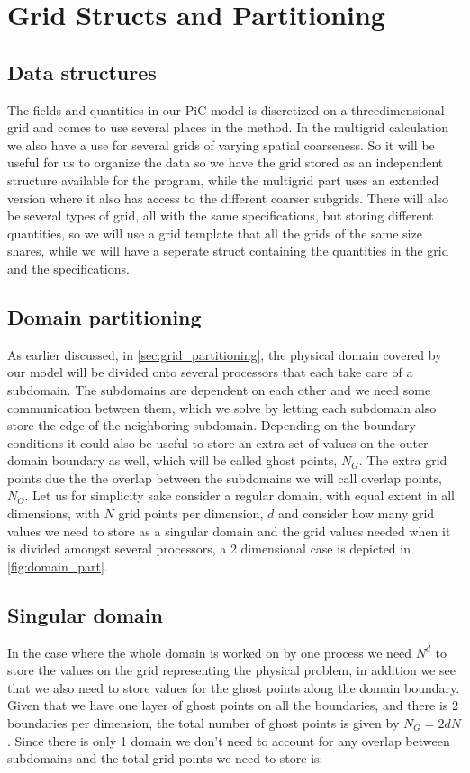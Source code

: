 	\section{Grid Structs and Partitioning}

	\subsection{Data structures}
	The fields and quantities in our PiC model is discretized on a threedimensional
	grid and comes to use several places in the method. In the multigrid calculation
	we also have a use for several grids of varying spatial coarseness. So it will
	be useful for us to organize the data so we have the grid stored as an
	independent structure available for the program, while the multigrid part uses
	an extended version where it also has access to the different coarser subgrids.
	There will also be several types of grid, all with the same specifications,
	but storing different quantities, so we will use a grid template that all the
	grids of the same size shares, while we will have a seperate struct containing
	the quantities in the grid and the specifications.



	\subsection{Domain partitioning}
		As earlier discussed, in \ref{sec:grid_partitioning}, the physical domain
		covered by our model will be divided onto several processors that each take
		care of a subdomain. The subdomains are dependent on each other and we need
		some communication between them, which we solve by letting each subdomain
		also store the edge of the neighboring subdomain. Depending on the boundary
		conditions it could also be useful to store an extra set of values on the
		outer domain boundary as well, which will be called ghost points, \(N_G\).
		The extra grid points due the the overlap between the subdomains we will call
		overlap points, \(N_O\). Let us for simplicity sake consider a regular domain,
		with equal extent in all dimensions, with \(N\) grid points per dimension,
		\(d\) and consider how many grid values we need to store as a singular domain
		and the grid values needed when it is divided amongst several processors, a
		2 dimensional case is depicted in \cref{fig:domain_part}.

		\subsection{Singular domain}
		In the case where the whole domain is worked on by one process we need \(N^d\)
		to store the values on the grid representing the physical problem, in addition
		we see that we also need to store values for the ghost points along the domain
		boundary. Given that we have one layer of ghost points on all the boundaries,
		and there is 2 boundaries per dimension, the total number of ghost points is
		given by \(N_G = 2dN\). Since there is only 1 domain we don't need to account
		for any overlap between subdomains and the total grid points we need to store is:

